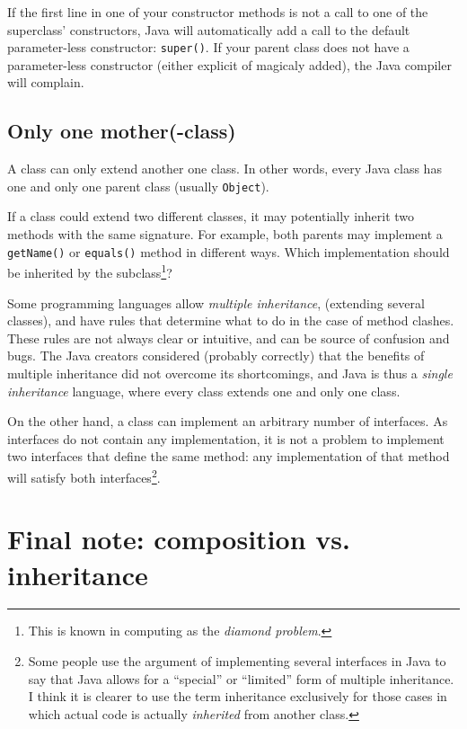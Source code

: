 If the first line in one of your constructor methods is not a call to
one of the superclass' constructors, Java will automatically add a
call to the default parameter-less constructor: \verb+super()+. If
your parent class does not have a parameter-less constructor (either
explicit of magicaly added), the Java compiler will complain. 

\subsection{Only one mother(-class)}
\label{sec:limits-inheritance}

A class can only extend another one class. In other words, every Java
class has one and only one parent class (usually \verb+Object+). 

If a class could extend two different classes, it may potentially
inherit two methods with the same signature. For example, both parents
may implement a \verb+getName()+ or \verb+equals()+ method in
different ways. Which implementation should be inherited by the
subclass\footnote{This is known in computing as the \emph{diamond
    problem}.}?

Some programming languages allow \emph{multiple inheritance},
(extending several classes), and have rules that determine what to do
in the case of method clashes. These rules are not always clear or
intuitive, and can be source of confusion and bugs. The Java creators
considered (probably correctly) that the benefits of multiple
inheritance did not overcome its shortcomings, and Java is thus a
\emph{single inheritance} language, where every class extends one and
only one class. 

On the other hand, a class can implement an arbitrary number of
interfaces. As interfaces do not contain any implementation, it is not
a problem to implement two interfaces that define the same method: any
implementation of that method will satisfy both
interfaces\footnote{Some people use the argument of implementing
  several interfaces in Java to say that Java allows for a ``special''
  or ``limited'' form of multiple inheritance. I think it is clearer
  to use the term inheritance exclusively for those cases 
  in which actual code is
  actually \emph{inherited} from another class. }. 

\section{Final note: composition vs. inheritance}
\label{sec:final-note:-comp}

